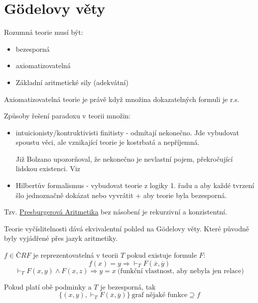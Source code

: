 \section{\texorpdfstring{G\"{o}delovy věty}{G\"{o}delovy věty}}
\vspace{5mm}
\large

\begin{definition}
	Rozumná teorie musí být:
	\begin{itemize}
		\item bezesporná
		\item axiomatizovatelná
		\item Základní aritmetické sily (adekvátní)
	\end{itemize}
\end{definition}

\begin{definition}
	Axiomatizovatelná teorie je právě když množina dokazatelných formuli je r.s.
\end{definition}

Způsoby řešení paradoxu v teorii množin:
\begin{itemize}
	\item intuicionisty/kontruktivisti finitisty - odmítají nekonečno.
		Jde vybudovat spoustu věci, ale vznikající teorie je kostrbatá a nepříjemná.

		Již Bolzano upozorňoval, že nekonečno je nevlastní pojem, překročující lidskou existenci. Viz ~\cite{bolzano2014paradoxes}
	\item Hilbertův formalismus - vybudovat teorie z logiky 1. řadu a aby každé tvrzení šlo jednoznačně dokázat nebo vyvrátit + aby teorie byla bezesporná.
\end{itemize}


\begin{note}
	Tzv. \href{https://en.wikipedia.org/wiki/Presburger_arithmetic}{Presburgerová Aritmetika}  bez násobení je rekurzivní a konzistentní.
\end{note}

\begin{note}
	Teorie vyčíslitelnosti dává ekvivalentní pohled na G\"{o}delovy věty. Které původně byly vyjádřené přes jazyk aritmetiky.
\end{note}

\begin{definition}[Reprezentovatelnost]
	$f \in ČRF$ je reprezentovatelná v teorii $T$ pokud existuje formule $F$:
	\[ f(x) = y \Rightarrow \vdash_T F(\overline{x}, \overline{y}) \]
	\[ \vdash_T F(x, y) \land F(x, z) \Rightarrow y = x\ \text{(funkční vlastnost, aby nebyla jen relace)} \]

	Pokud platí obě podminky a $T$ je bezesporná, tak
	\[ \{ (x, y), \vdash_T F(\overline{x}, \overline{y}) \}\ \text{graf nějaké funkce} \supseteq f \]
\end{definition}

